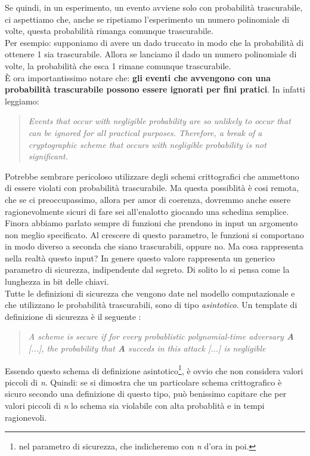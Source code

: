\documentclass[a4paper,openright,twoside,12pt]{report}
\begin{document}
Se quindi, in un esperimento, un evento avviene solo con probabilit\`a trascurabile, ci aspettiamo che, anche se ripetiamo l'esperimento un numero polinomiale di volte, questa probabilit\`a
rimanga comunque trascurabile.\\
Per esempio: supponiamo di avere un dado truccato in modo che la probabilit\`a di ottenere 1 sia trascurabile. Allora se lanciamo il dado un numero polinomiale di volte, la probabilit\`a
che esca 1 rimane comunque trascurabile.\\
\`E ora importantissimo notare che:
\textbf{gli eventi che avvengono con una probabilit\`a trascurabile possono essere ignorati per fini pratici}.
In \cite{1206501} infatti leggiamo:
\begin{quotation}
\emph{Events that occur with negligible probability are so unlikely to occur that can be ignored for all practical purposes. Therefore,
a break of a cryptographic scheme that occurs with negligible probability is not significant.}
\end{quotation}
Potrebbe sembrare pericoloso utilizzare degli schemi crittografici che ammettono di essere violati con probabilit\`a trascurabile. 
Ma questa possiblit\`a \`e cosi remota, che se ci preoccupassimo, allora per amor di coerenza, dovremmo anche essere ragionevolmente sicuri di 
fare sei all'enalotto giocando una schedina semplice.
Finora abbiamo parlato sempre di funzioni che prendono in input un argomento non meglio specificato. 
Al crescere di questo parametro, le funzioni si comportano in modo diverso a seconda che siano trascurabili, oppure no.
Ma cosa rappresenta nella realt\`a questo input?
In genere questo valore rappresenta un generico parametro di sicurezza, indipendente dal segreto. Di solito lo si pensa come la lunghezza in bit delle chiavi.\\
Tutte le definizioni di sicurezza che vengono date nel modello computazionale e che utilizzano le probabilit\`a trascurabili, sono di tipo \emph{asintotico}.
Un template di definizione di sicurezza è il seguente \cite{1206501}:
\begin{quotation}
\emph{A scheme is secure if for every probablistic polynomial-time adversary \textbf{A} [...], the probability that \textbf{A} succeds in this attack [...]
is negligible}
\end{quotation}
Essendo questo schema di definizione asintotico\footnote{nel parametro di sicurezza, che indicheremo con \emph{n} d'ora in poi.}, \`e ovvio che non considera valori piccoli di \emph{n}.
Quindi: se si dimostra che un particolare schema crittografico \`e sicuro secondo una definizione di questo tipo, pu\`o benissimo capitare che per valori piccoli di \emph{n} lo schema
sia violabile con alta probablit\`a e in tempi ragionevoli.
\newpage
\end{document}
